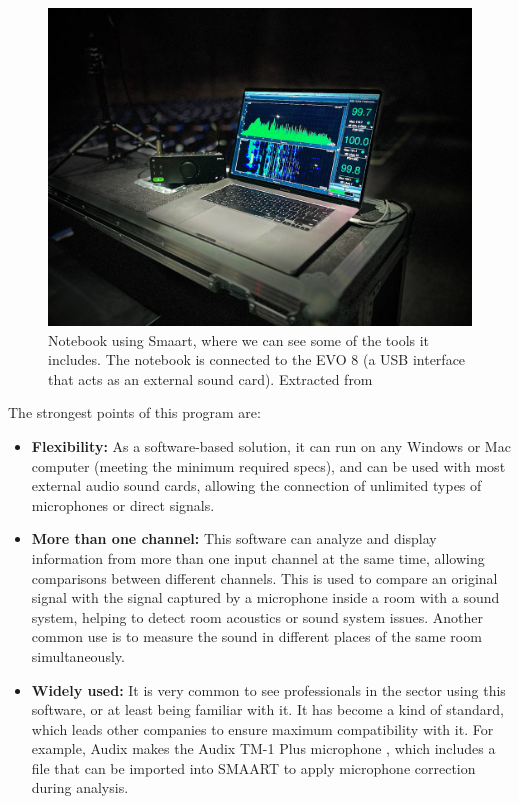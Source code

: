 \begin{figure}[H]
	\centering
	\includegraphics[width=0.9
	\linewidth]{Figures/smaart_01.png}
	\caption [Notebook using Smaart]{Notebook using Smaart, where we can see some of the tools it includes. The notebook is connected to the EVO 8 (a USB interface that acts as an external sound card). Extracted from \cite{smaart_image}}
	\label{fig:SMAART}
\end{figure}
	
The strongest points of this program are:

\begin{itemize}
	\item \textbf{Flexibility:} As a software-based solution, it can run on any Windows or Mac computer (meeting the minimum required specs), and can be used with most external audio sound cards, allowing the connection of unlimited types of microphones or direct signals.
	
	\item \textbf{More than one channel:} This software can analyze and display information from more than one input channel at the same time, allowing comparisons between different channels. This is used to compare an original signal with the signal captured by a microphone inside a room with a sound system, helping to detect room acoustics or sound system issues. Another common use is to measure the sound in different places of the same room simultaneously.
	
	\item \textbf{Widely used:} It is very common to see professionals in the sector using this software, or at least being familiar with it. It has become a kind of standard, which leads other companies to ensure maximum compatibility with it. For example, Audix makes the Audix TM-1 Plus microphone \cite{AudixTM1}, which includes a file that can be imported into SMAART to apply microphone correction during analysis.
\end{itemize}


